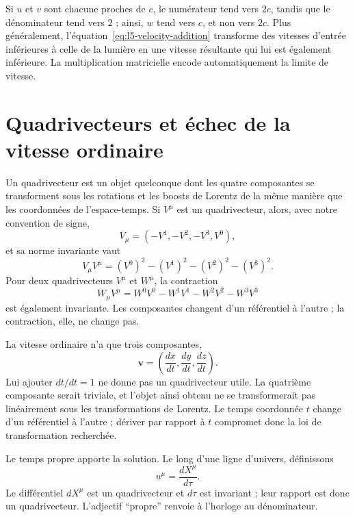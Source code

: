 Si \(u\) et \(v\) sont chacune proches de \(c\), le numérateur tend vers \(2c\), tandis que le dénominateur tend vers \(2\) ; ainsi, \(w\) tend vers \(c\), et non vers \(2c\). Plus généralement, l’équation~\eqref{eq:l5-velocity-addition} transforme des vitesses d’entrée inférieures à celle de la lumière en une vitesse résultante qui lui est également inférieure. La multiplication matricielle encode automatiquement la limite de vitesse.

\section{Quadrivecteurs et échec de la vitesse ordinaire}

Un quadrivecteur est un objet quelconque dont les quatre composantes se transforment sous les rotations et les boosts de Lorentz de la même manière que les coordonnées de l’espace-temps. Si \(V^\mu\) est un quadrivecteur, alors, avec notre convention de signe,
\begin{equation}
V_\mu=(-V^1,-V^2,-V^3,V^0),
\end{equation}
et sa norme invariante vaut
\begin{equation}
V_\mu V^\mu=(V^0)^2-(V^1)^2-(V^2)^2-(V^3)^2.
\end{equation}
Pour deux quadrivecteurs \(V^\mu\) et \(W^\mu\), la contraction
\begin{equation}
W_\mu V^\mu
=W^0V^0-W^1V^1-W^2V^2-W^3V^3
\end{equation}
est également invariante. Les composantes changent d’un référentiel à l’autre ; la contraction, elle, ne change pas.

La vitesse ordinaire n’a que trois composantes,
\begin{equation}
\mathbf v=\left(\frac{dx}{dt},\frac{dy}{dt},\frac{dz}{dt}\right).
\end{equation}
Lui ajouter \(dt/dt=1\) ne donne pas un quadrivecteur utile. La quatrième composante serait triviale, et l’objet ainsi obtenu ne se transformerait pas linéairement sous les transformations de Lorentz. Le temps coordonnée \(t\) change d’un référentiel à l’autre ; dériver par rapport à \(t\) compromet donc la loi de transformation recherchée.

Le temps propre apporte la solution. Le long d’une ligne d’univers, définissons
\begin{equation}
u^\mu=\frac{dX^\mu}{d\tau}.
\label{eq:l5-four-velocity}
\end{equation}
Le différentiel \(dX^\mu\) est un quadrivecteur et \(d\tau\) est invariant ; leur rapport est donc un quadrivecteur. L’adjectif ``propre'' renvoie à l’horloge au dénominateur.


